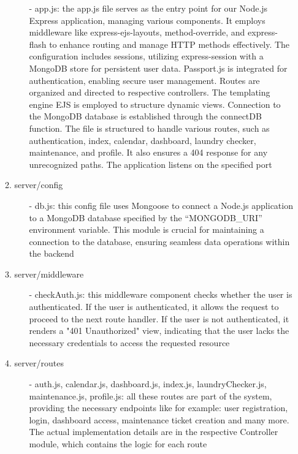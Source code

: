 \documentclass[conference]{IEEEtran}
\begin{document}
\begin{enumerate}
\begin{enumerate}
\begin{itemize}
                    \item[-] app.js: the app.js file serves as the entry point for our Node.js Express application, managing various components. It employs middleware like express-ejs-layouts, method-override, and express-flash to enhance routing and manage HTTP methods effectively. The configuration includes sessions, utilizing express-session with a MongoDB store for persistent user data. Passport.js is integrated for authentication, enabling secure user management. Routes are organized and directed to respective controllers. The templating engine EJS is employed to structure dynamic views. Connection to the MongoDB database is established through the connectDB function. The file is structured to handle various routes, such as authentication, index, calendar, dashboard, laundry checker, maintenance, and profile. It also ensures a 404 response for any unrecognized paths. The application listens on the specified port
                \end{itemize}
            \item server/config
                \begin{itemize}
                    \item[-] db.js: this config file uses Mongoose to connect a Node.js application to a MongoDB database specified by the “MONGODB\_URI” environment variable. This module is crucial for maintaining a connection to the database, ensuring seamless data operations within the backend
                \end{itemize}
            \item server/middleware
                \begin{itemize}
                    \item[-] checkAuth.js: this middleware component checks whether the user is authenticated. If the user is authenticated, it allows the request to proceed to the next route handler. If the user is not authenticated, it renders a "401 Unauthorized" view, indicating that the user lacks the necessary credentials to access the requested resource
                \end{itemize}
            \item server/routes
                \begin{itemize}
                    \item[-] auth.js, calendar.js, dashboard.js, index.js, laundryChecker.js, maintenance.js, profile.js: all these routes are part of the system, providing the necessary endpoints like for example: user registration, login, dashboard access, maintenance ticket creation and many more. The actual implementation details are in the respective Controller module, which contains the logic for each route

\end{itemize}
\end{enumerate}
\end{enumerate}
\end{document}
